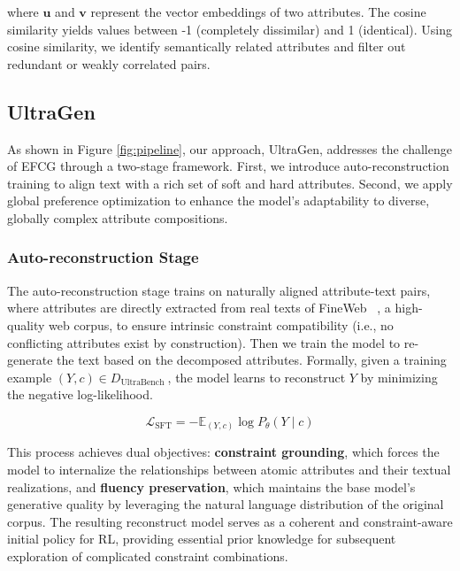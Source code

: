 where $\mathbf{u}$ and $\mathbf{v}$ represent the vector embeddings of two attributes. The cosine similarity yields values between -1 (completely dissimilar) and 1 (identical). Using cosine similarity, we identify semantically related attributes and filter out redundant or weakly correlated pairs.

\subsection{UltraGen}
As shown in Figure \ref{fig:pipeline}, our approach, UltraGen, addresses the challenge of EFCG through a two-stage framework.
First, we introduce auto-reconstruction training to align text with a rich set of soft and hard attributes.
Second, we apply global preference optimization to enhance the model’s adaptability to diverse, globally complex attribute compositions. 

\subsubsection{Auto-reconstruction Stage}
The auto-reconstruction stage trains on naturally aligned attribute-text pairs, where attributes are directly extracted from real texts of FineWeb ~\cite{penedo2024the}, a high-quality web corpus, to ensure intrinsic constraint compatibility (i.e., no conflicting attributes exist by construction). Then we train the model to re-generate the text based on the decomposed attributes.
Formally, given a training example $(Y, c) \in D_{\text {UltraBench }}$, the model learns to reconstruct $Y$ by minimizing the negative log-likelihood.

$$
\mathcal{L}_{\mathrm{SFT}}=-\mathbb{E}_{(Y, c)} \log P_\theta(Y \mid c)
$$

This process achieves dual objectives: \textbf{constraint grounding}, which forces the model to internalize the relationships between atomic attributes and their textual realizations, and \textbf{fluency preservation}, which maintains the base model’s generative quality by leveraging the natural language distribution of the original corpus.  The resulting reconstruct model serves as a coherent and constraint-aware initial policy for RL, providing essential prior knowledge for subsequent exploration of complicated constraint combinations.

